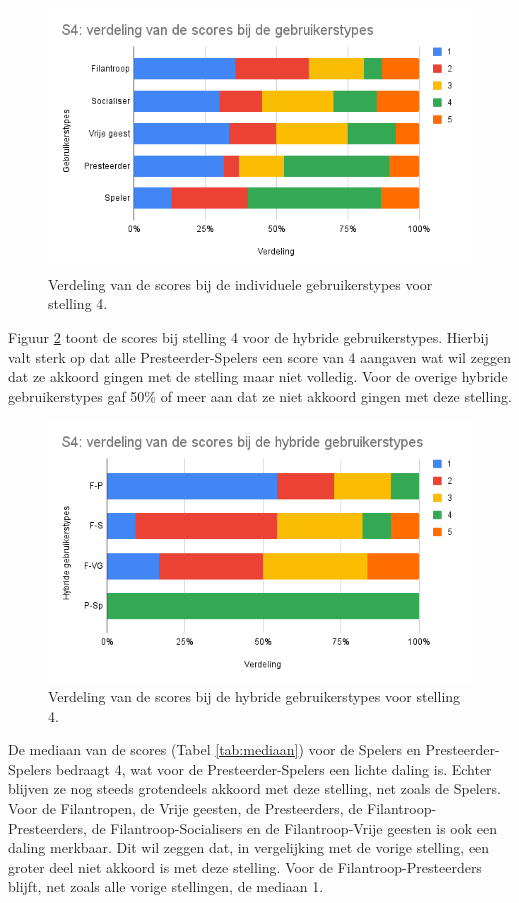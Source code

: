 \begin{figure}
    \includegraphics[width=\linewidth]{S4.png}
    \caption{Verdeling van de scores bij de individuele gebruikerstypes voor stelling 4.}
    \label{fig:s4}
\end{figure}

Figuur \ref{fig:s4_hybride} toont de scores bij stelling 4 voor de hybride gebruikerstypes. Hierbij valt sterk op dat alle Presteerder-Spelers een score van 4 aangaven wat wil zeggen dat ze akkoord gingen met de stelling maar niet volledig. Voor de overige hybride gebruikerstypes gaf 50\% of meer aan dat ze niet akkoord gingen met deze stelling.

\begin{figure}
    \includegraphics[width=\linewidth]{S4_Hybride.png}
    \caption{Verdeling van de scores bij de hybride gebruikerstypes voor stelling 4.}
    \label{fig:s4_hybride}
\end{figure}

De mediaan van de scores (Tabel \ref{tab:mediaan}) voor de Spelers en Presteerder-Spelers bedraagt 4, wat voor de Presteerder-Spelers een lichte daling is. Echter blijven ze nog steeds grotendeels akkoord met deze stelling, net zoals de Spelers. Voor de Filantropen, de Vrije geesten, de Presteerders, de Filantroop-Presteerders, de Filantroop-Socialisers en de Filantroop-Vrije geesten is ook een daling merkbaar. Dit wil zeggen dat, in vergelijking met de vorige stelling, een groter deel niet akkoord is met deze stelling. Voor de Filantroop-Presteerders blijft, net zoals alle vorige stellingen, de mediaan 1.

